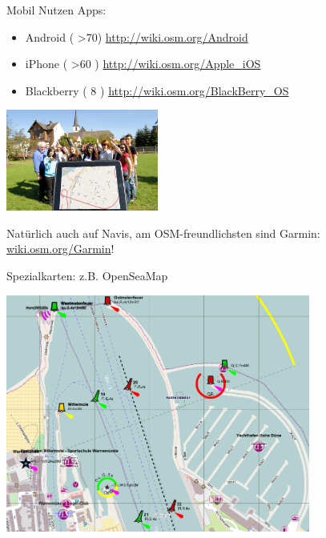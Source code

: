 \documentclass{beamer}
\begin{document}
\begin{frame}{Mobil Nutzen}
	Apps:
 
 \begin{itemize}
   \item  Android ( \textgreater 70) \url{http://wiki.osm.org/Android}
   \item  iPhone ( \textgreater 60 )  \url{http://wiki.osm.org/Apple\_iOS}
   \item  Blackberry ( 8 ) \url{http://wiki.osm.org/BlackBerry\_OS}
 \end{itemize}
 
 \begin{center}
 \includegraphics[width=5cm]{tablet.jpg}
 \end{center}

 Natürlich auch auf Navis, am OSM-freundlichsten sind Garmin: \href{http://wiki.osm.org/Garmin}{wiki.osm.org/Garmin}!

\end{frame}

\begin{frame}{Spezialkarten: z.B. OpenSeaMap}

 \includegraphics[width=10cm]{style-seamap.png}

\end{frame}
\end{document}
